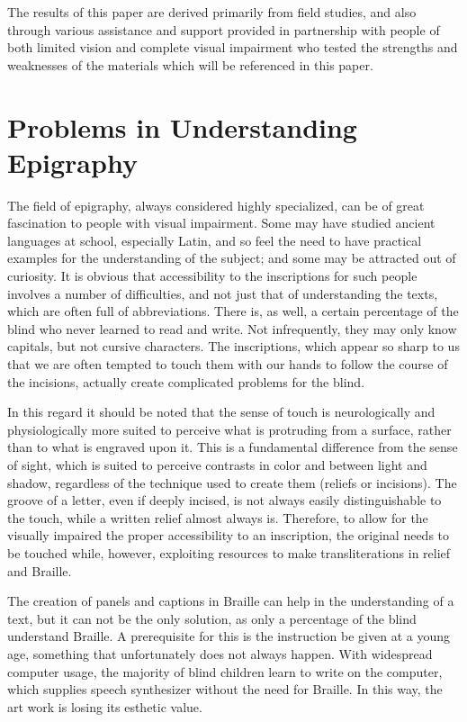\documentclass[amsthm,ebook]{saparticle}
\begin{document}
The results of this paper are derived primarily from field studies, and also through various assistance and support
provided in partnership with people of both limited vision and complete visual impairment who tested the strengths and
weaknesses of the materials which will be referenced in this paper.







\section{Problems in Understanding Epigraphy}
\noindent The field of epigraphy, always considered highly specialized, can be of great fascination to people with visual
impairment. Some may have studied ancient languages at school, especially Latin, and so feel the need to have practical
examples for the understanding of the subject; and some may be attracted out of curiosity. It is obvious that
accessibility to the inscriptions for such people involves a number of difficulties, and not just that of understanding
the texts, which are often full of abbreviations. There is, as well, a certain percentage of the blind who never
learned to read and write. Not infrequently, they may only know capitals, but not cursive characters. The inscriptions,
which appear so sharp to us that we are often tempted to touch them with our hands to follow the course of the
incisions, actually create complicated problems for the blind.

In this regard it should be noted that the sense of touch is neurologically and physiologically more suited to perceive
what is protruding from a surface, rather than to what is engraved upon it. This is a fundamental difference from the
sense of sight, which is suited to perceive contrasts in color and between light and shadow, regardless of the
technique used to create them (reliefs or incisions). The groove of a letter, even if deeply incised, is not always
easily distinguishable to the touch, while a written relief almost always is. Therefore, to allow for the visually
impaired the proper accessibility to an inscription, the original needs to be touched while, however, exploiting
resources to make transliterations in relief and Braille.

The creation of panels and captions in Braille can help in the understanding of a text, but it can not be the only
solution, as only a percentage of the blind understand Braille. A prerequisite for this is the instruction be given at
a young age, something that unfortunately does not always happen. With widespread computer usage, the majority of blind
children learn to write on the computer, which supplies speech synthesizer without the need for Braille. In this way,
the art work is losing its esthetic value.
\end{document}
